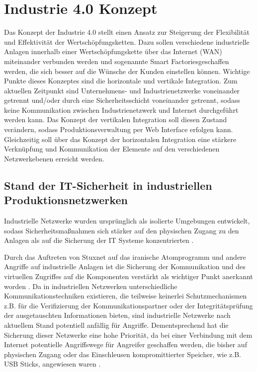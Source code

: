 \section{Industrie 4.0 Konzept}
Das Konzept der Industrie 4.0 stellt einen Ansatz zur Steigerung der Flexibilität und Effektivität der Wertschöpfungsketten. Dazu sollen verschiedene industrielle Anlagen innerhalb einer Wertschöpfungskette über das Internet (WAN) miteinander verbunden werden und sogenannte \glqq Smart Factories\grqq geschaffen werden, die sich besser auf die Wünsche der Kunden einstellen können. Wichtige Punkte dieses Konzeptes sind die horizontale und vertikale Integration. Zum aktuellen Zeitpunkt sind Unternehmens- und Industrienetzwerke voneinander getrennt und/oder durch eine Sicherheitsschicht voneinander getrennt, sodass keine Kommunikation zwischen Industrienetzwerk und Internet durchgeführt werden kann. Das Konzept der vertikalen Integration soll diesen Zustand verändern, sodass Produktionsverwaltung per Web Interface erfolgen kann. Gleichzeitig soll über das Konzept der horizontalen Integration eine stärkere Verknüpfung und Kommunikation der Elemente auf den verschiedenen Netzwerkebenen erreicht werden\citep{Ind401}.


\subsection{Stand der IT-Sicherheit in industriellen Produktionsnetzwerken}
Industrielle Netzwerke wurden ursprünglich als isolierte Umgebungen entwickelt, sodass Sicherheitsmaßnahmen sich stärker auf den physischen Zugang zu den Anlagen als auf die Sicherung der IT Systeme konzentrierten \citep{6622964}. 

Durch das Auftreten von Stuxnet auf das iranische Atomprogramm und andere Angriffe auf industrielle Anlagen ist die Sicherung der Kommunikation und des virtuellen Zugriffes auf die Komponenten verstärkt als wichtiger Punkt anerkannt worden \citep{6622964}. 
Da in industriellen Netzwerken unterschiedliche Kommunikationstechniken existieren, die teilweise keinerlei Schutzmechanismen z.B. für die Verifizierung der Kommunikationspartner oder der Integritätsprüfung der ausgetauschten Informationen bieten, sind industrielle Netzwerke nach aktuellem Stand potentiell anfällig für Angriffe. Dementsprechend hat die Sicherung dieser Netzwerke eine hohe Priorität, da bei einer Verbindung mit dem Internet potentielle Angriffswege für Angreifer geschaffen werden, die bisher auf physischen Zugang oder das Einschleusen kompromittierter Speicher, wie z.B. USB Sticks, angewiesen waren \citep{6622964}. 

